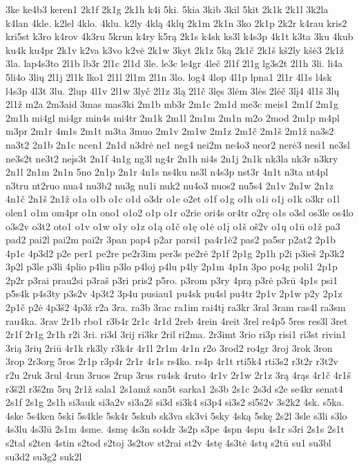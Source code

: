 {3ke
ke4b3
keren1
2k1f
2k1g
2k1h
k4i
5ki.
5kia
3kib
3kil
5kit
2k1k
2k1l
3k2la
k4lan
4kle.
k2lel
4klo.
4klu.
k2ly
4klą
4klų
2k1m
2k1n
3ko
2k1p
2k2r
k4rau
kris2
kri5st
k3ro
k4rov
4k3ru
5krun
k4ry
k5rą
2k1s
k4sk
ks3l
k4s3p
4k1t
k3ta
3ku
4kub
ku4k
ku4pr
2k1v
k2va
k3vo
k2vė
2k1w
3kyt
2k1z
5ką
2k1č
2k1š
kš2ly
kšė3
2k1ž
3la.
lap4s3to
2l1b
lb3r
2l1c
2l1d
3le.
le3c
le4gr
4leč
2l1f
2l1g
lg3s2t
2l1h
3li.
li4a
5li4o
3lių
2l1j
2l1k
lko1
2l1l
2l1m
2l1n
3lo.
log4
4lop
4l1p
lpna1
2l1r
4l1s
l4sk
l4s3p
4l3t
3lu.
2lup
4l1v
2l1w
3lyč
2l1z
3lą
2l1č
3lęs
3lėm
3lės
2lėč
3lį4
4l1š
3lų
2l1ž
m2a
2m3aid
3mas
mas3ki
2m1b
mb3r
2m1c
2m1d
me3c
meis1
2m1f
2m1g
2m1h
mi4gl
mi4gr
min4s
mi4tr
2m1k
2m1l
2m1m
2m1n
m2o
2mod
2m1p
m4pl
m3pr
2m1r
4m1s
2m1t
m3ta
3muo
2m1v
2m1w
2m1z
2m1č
2m1š
2m1ž
na3s2
na3t2
2n1b
2n1c
ncen1
2n1d
n3drė
ne1
neg4
nei2m
ne4o3
neor2
nerė3
nesi1
ne3sl
ne3s2t
ne3t2
neįs3t
2n1f
4n1g
ng3l
ng4r
2n1h
ni4s
2n1j
2n1k
nk3la
nk3r
n3kry
2n1l
2n1m
2n1n
5no
2n1p
2n1r
4n1s
ns4ku
ns3l
n4s3p
nst3r
4n1t
n3ta
nt4pl
n3tru
nt2ruo
nua4
nu3b2
nu3g
nu1i
nuk2
nu4o3
nuos2
nu5s4
2n1v
2n1w
2n1z
4n1č
2n1š
2n1ž
o1a
o1b
o1c
o1d
o3dr
o1e
o2et
o1f
o1g
o1h
o1i
o1j
o1k
o3kr
o1l
olen1
o1m
om4pr
o1n
ono1
o1o2
o1p
o1r
o2rie
ori4s
or4tr
o2rę
o1s
o3sl
os3le
os4lo
o3s2v
o3t2
oto1
o1v
o1w
o1y
o1z
o1ą
o1č
o1ę
o1ė
o1į
o1š
oš2v
o1ų
o1ū
o1ž
pa3
pad2
pai2l
pai2m
pai2r
3pan
pap4
p2ar
parsi1
pa4r1ė2
pas2
pa5sr
p2at2
2p1b
4p1c
4p3d2
p2e
per1
pe2re
pe2r3im
per3s
pe2rė
2p1f
2p1g
2p1h
p2i
p3ieš
2p3k2
3p2l
p3le
p3li
4plio
p4liu
p3lo
p4loj
p4lu
p4ly
2p1m
4p1n
3po
po4g
poli1
2p1p
2p2r
p3rai
prau2si
p3raš
p3ri
pris2
p5ro.
p3rom
p3ry
4prą
p3rė
p3rū
4p1s
psi1
p5s4k
p4s3ty
p3s2v
4p3t2
3p4u
pusiau1
pu4sk
pu4sl
pu4tr
2p1v
2p1w
p2y
2p1z
2p1č
p2ė
4p3š2
4p3ž
r2a
3ra.
ra3b
3rac
ra1im
rai4tį
ra3kr
3ral
3ram
ras4l
ra3sm
rau4ka.
3rav
2r1b
rbo1
r3b4r
2r1c
4r1d
2reb
4rein
4reit
3rel
re4p5
5res
res3l
3ret
2r1f
2r1g
2r1h
r2i
3ri.
ri3d
3rij
ri3kr
2ril
ri2ma.
2r3imt
3rio
ri3p
risi1
ri3st
rivin1
3rią
3rių
2riū
4r1k
rk3ly
r3k4r
4r1l
2r1m
4r1n
r2o
3rod2
ro4gr
3roj
3rok
3ron
3rop
2r3org
5ros
2r1p
r3p4r
2r1r
4r1s
rs4ko.
rs4p
4r1t
rti5k4
rti3s2
r3t2r
r3t2v
r2u
2ruk
3rul
4run
3ruos
2rup
3rus
ru4sk
4ruto
4r1v
2r1w
2r1z
3rą
4rąs
4r1č
4r1š
r3š2l
r3š2m
5rų
2r1ž
sala1
2s1amž
san5t
sarka1
2s3b
2s1c
2s3d
s2e
se4kr
senat4
2s1f
2s1g
2s1h
si3auk
si3a2v
si3a2š
si3d
si3k4
si3p4
si3s2
si5š2v
3s2k2
4sk.
s5ka.
4ske
5s4ken
5ski
5s4kle
5sk4r
5skub
sk3va
sk3vi
5sky
4ską
5skę
2s2l
3sle
s3li
s3lo
4s3lu
4s3lū
2s1m
4sme.
4smę
4s3n
so4dr
3s2p
s3pe
4spn
4spu
4s1r
s3ri
2s1s
2s1t
s2tal
s2ten
4stin
s2tod
s2toj
3s2tov
st2rai
st2v
4stę
4s3tė
4stų
s2tū
su1
su3bl
su3d2
su3g2
suk2l
}
